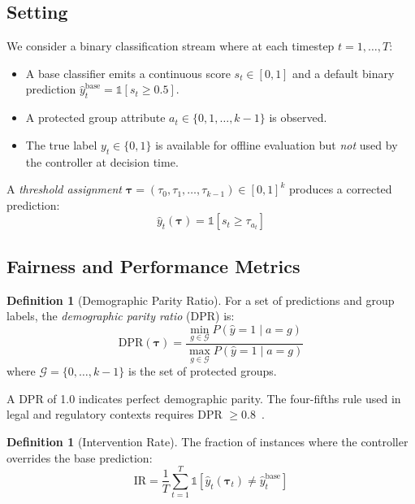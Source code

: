\documentclass[10pt,twocolumn]{article}
\theoremstyle{definition}
\newtheorem{definition}[theorem]{Definition}
\begin{document}
\subsection{Setting}
We consider a binary classification stream where at each timestep $t = 1, \ldots, T$:
\begin{itemize}
    \item A base classifier emits a continuous score $s_t \in [0,1]$ and a default binary prediction $\hat{y}_t^{\text{base}} = \mathbb{1}[s_t \geq 0.5]$.
    \item A protected group attribute $a_t \in \{0, 1, \ldots, k{-}1\}$ is observed.
    \item The true label $y_t \in \{0,1\}$ is available for offline evaluation but \emph{not} used by the controller at decision time.
\end{itemize}

A \emph{threshold assignment} $\boldsymbol{\tau} = (\tau_0, \tau_1, \ldots, \tau_{k-1}) \in [0,1]^k$ produces a corrected prediction:
\begin{equation}
\hat{y}_t(\boldsymbol{\tau}) = \mathbb{1}[s_t \geq \tau_{a_t}]
\label{eq:threshold_pred}
\end{equation}

\subsection{Fairness and Performance Metrics}

\begin{definition}[Demographic Parity Ratio]
For a set of predictions and group labels, the \emph{demographic parity ratio} (DPR) is:
\begin{equation}
\text{DPR}(\boldsymbol{\tau}) = \frac{\min_{g \in \mathcal{G}} P(\hat{y}=1 \mid a=g)}{\max_{g \in \mathcal{G}} P(\hat{y}=1 \mid a=g)}
\label{eq:dpr}
\end{equation}
where $\mathcal{G} = \{0, \ldots, k{-}1\}$ is the set of protected groups.
\end{definition}

A DPR of 1.0 indicates perfect demographic parity. The four-fifths rule used in legal and regulatory contexts requires DPR $\geq 0.8$~\cite{biddle2006adverse}.

\begin{definition}[Intervention Rate]
The fraction of instances where the controller overrides the base prediction:
\begin{equation}
\text{IR} = \frac{1}{T}\sum_{t=1}^T \mathbb{1}[\hat{y}_t(\boldsymbol{\tau}_t) \neq \hat{y}_t^{\text{base}}]
\end{equation}
\end{definition}
\end{document}
